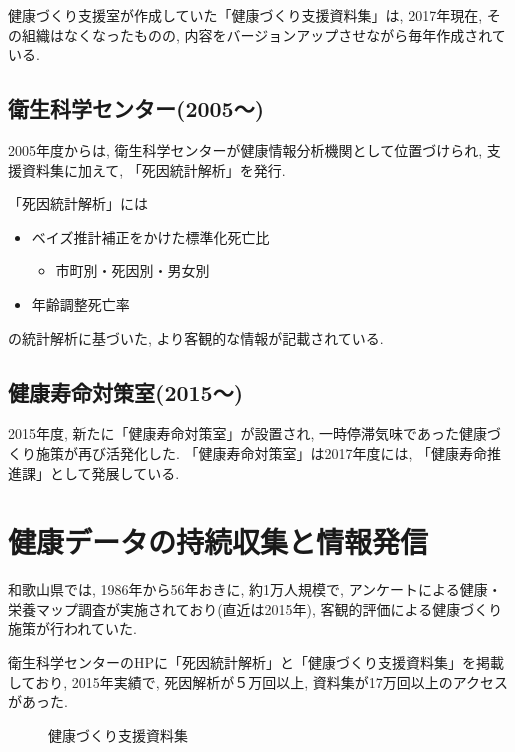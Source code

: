健康づくり支援室が作成していた「健康づくり支援資料集」は, 2017年現在, その組織はなくなったものの,
内容をバージョンアップさせながら毎年作成されている.

\subsection{衛生科学センター(2005〜)}

2005年度からは, 衛生科学センターが健康情報分析機関として位置づけられ, 支援資料集に加えて,
「死因統計解析」を発行.

「死因統計解析」には
\begin{itemize} \setlength{\itemsep}{-0.5mm} \setlength{\parskip}{-0.5mm}
	\item ベイズ推計補正をかけた標準化死亡比
	      \begin{itemize} \setlength{\itemsep}{-0.5mm} \setlength{\parskip}{-0.5mm}
		      \item 市町別・死因別・男女別
	      \end{itemize}
	\item 年齢調整死亡率
\end{itemize}
の統計解析に基づいた, より客観的な情報が記載されている.

\subsection{健康寿命対策室(2015〜)}
2015年度, 新たに「健康寿命対策室」が設置され, 一時停滞気味であった健康づくり施策が再び活発化した. 	「健康寿命対策室」は2017年度には, 「健康寿命推進課」として発展している.

\section{健康データの持続収集と情報発信}
和歌山県では, 1986年から56年おきに, 約1万人規模で, アンケートによる健康・栄養マップ調査が実施されており(直近は2015年), 客観的評価による健康づくり施策が行われていた.

衛生科学センターのHPに「死因統計解析」と「健康づくり支援資料集」を掲載しており, 2015年実績で, 死因解析が５万回以上, 資料集が17万回以上のアクセスがあった.
\begin{figure}[h!]
	\begin{center}
		\caption{健康づくり支援資料集}\label{fig1}
	\end{center}
\end{figure}





